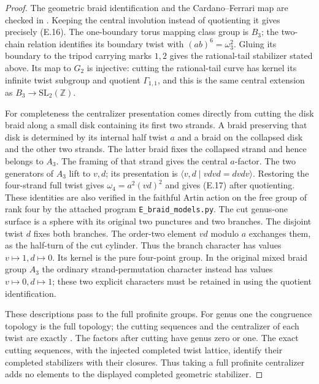 \begin{proof}
The geometric braid identification and the Cardano--Ferrari
map are checked in \cite[Corollary C; proof of Proposition
3.2(i), especially (3.1)--(3.5)]{ET_MN2022}.  Keeping the central
involution instead of quotienting it gives precisely (E.16).
The one-boundary torus mapping class group is $B_3$; the
two-chain relation identifies its boundary twist with
$(ab)^6=\omega _3^2$.  Gluing its boundary to the tripod
carrying marks $1,2$ gives the rational-tail stabilizer stated
above.  Its map to $G_2$ is injective: cutting the rational-tail
curve has kernel its infinite twist subgroup and quotient
$\Gamma_{1,1}$, and this is the same central extension as
$B_3\to\mathrm{SL}_2(\mathbb Z)$.

For completeness the centralizer presentation comes directly
from cutting the disk braid along a small disk containing its
first two strands.  A braid preserving that disk is determined
by its internal half twist $a$ and a braid on the collapsed disk
and the other two strands.  The latter braid fixes the collapsed
strand and hence belongs to $A_3$.  The framing of that strand
gives the central $a$-factor.  The two generators of $A_3$ lift
to $v,d$; its presentation is
$\langle v,d\mid vdvd=dvdv\rangle$.
Restoring the four-strand full twist gives
$\omega _4=a^2(vd)^2$ and gives (E.17) after quotienting.
These identities are also verified in the faithful Artin action
on the free group of rank four by the attached program
\texttt{E\_braid\_models.py}.
The cut genus-one surface is a sphere with its original two
punctures and two branches.  The disjoint twist $d$ fixes both
branches.  The order-two element $vd$ modulo $a$ exchanges
them, as the half-turn of the cut cylinder.  Thus the branch
character has values $v\mapsto1,d\mapsto0$.  Its kernel is
the pure four-point group.  In the original mixed braid group
$A_3$ the ordinary strand-permutation character instead has
values $v\mapsto0,d\mapsto1$; these two explicit characters
must be retained in using the quotient identification.

These descriptions pass to the full profinite groups.
For genus one the congruence topology is the full topology;
the cutting sequences and the centralizer of each twist are
exactly \cite[Corollary 4.9, Theorem 4.10, Corollary 4.12]{ET_BF2023}.
The factors after cutting have genus zero or one.  The exact
cutting sequences, with the injected completed twist lattice,
identify their completed stabilizers with their closures.
Thus taking a full profinite centralizer adds no elements to
the displayed completed geometric stabilizer.


\end{proof}
